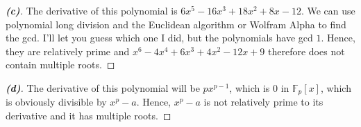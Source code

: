 \documentclass[10pt]{article}
\newenvironment{problem}[2][Problem]{\begin{trivlist}
		\item[\hskip \labelsep {\bfseries #1}\hskip \labelsep {\bfseries #2.}]}{\end{trivlist}}
\begin{document}
\begin{problem}{19}
		\begin{proof}[\textbf{(c)}]
			The derivative of this polynomial is $6x^5 - 16x^3 + 18x^2 + 8x - 12$. We can use polynomial long division and the Euclidean algorithm or Wolfram Alpha to find the gcd. I'll let you guess which one I did, but the polynomials have gcd $1$. Hence, they are relatively prime and $x^6 - 4x^4 + 6x^3 + 4x^2 - 12x + 9$ therefore does not contain multiple roots.
		\end{proof}

		\begin{proof}[\textbf{(d)}]
			The derivative of this polynomial will be $px^{p-1}$, which is $0$ in $\mathbb{F}_p[x]$, which is obviously divisible by $x^p-a$. Hence, $x^p-a$ is not relatively prime to its derivative and it has multiple roots.
		\end{proof}
	\end{problem}
\end{document}
